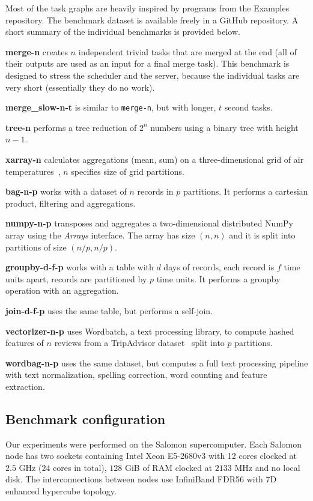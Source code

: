 Most of the task graphs are heavily inspired by programs from the \dask{} Examples
repository. The benchmark dataset is available freely in a GitHub
repository. A short summary of the individual benchmarks is provided below.

\noindent\textbf{merge-n} creates $n$ independent trivial tasks that are
merged at the end (all of their outputs are used as an input for a final merge task). This
benchmark is designed to stress the scheduler and the server, because the individual tasks are very
short (essentially they do no work).

\noindent\textbf{merge\_slow-n-t} is similar to \texttt{merge-n}, but with longer,
$t$ second tasks.

\noindent\textbf{tree-n} performs a tree reduction of $2^n$ numbers using a
binary tree with height $n-1$.

\noindent\textbf{xarray-n} calculates aggregations (mean, sum) on a
three-dimensional grid of air temperatures~\cite{airdataset}, $n$ specifies
size of grid partitions.

\noindent\textbf{bag-n-p} works with a dataset of $n$ records in
$p$ partitions. It performs a cartesian product, filtering and aggregations.

\noindent\textbf{numpy-n-p} transposes and aggregates a two-dimensional
distributed NumPy array using the \emph{Arrays} interface. The array has size
$(n,n)$ and it is split into partitions of size $(n/p,n/p)$.

\noindent\textbf{groupby-d-f-p} works with a table with $d$ days of records,
each record is $f$ time units apart, records are partitioned by
$p$ time units. It performs a groupby operation with an aggregation.

\noindent\textbf{join-d-f-p} uses the same table, but performs a self-join.

\noindent\textbf{vectorizer-n-p} uses
Wordbatch, a text processing library, to compute hashed features of
$n$ reviews from a TripAdvisor dataset~\cite{wordbatcharticle} split into
$p$ partitions.

\noindent\textbf{wordbag-n-p} uses the same dataset, but computes a full text processing
pipeline with text normalization, spelling correction, word counting and feature extraction.

\subsection*{Benchmark configuration}
Our experiments were performed on the Salomon supercomputer. Each Salomon
node has two sockets containing Intel Xeon E5-2680v3 with 12 cores clocked at
$2.5$ GHz ($24$ cores in total), $128$ GiB of
RAM clocked at $2133$ MHz and no local disk. The interconnections between nodes use
InfiniBand FDR56 with 7D enhanced hypercube topology.

